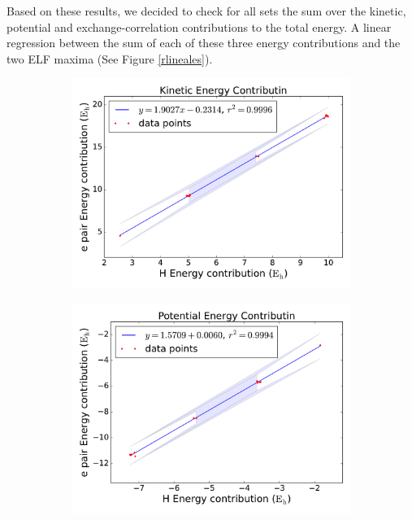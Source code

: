 Based on these results, we decided to check for all sets the sum over the
kinetic, potential and exchange-correlation contributions to the total energy.
A linear regression between the sum of each of these three energy contributions
and the two ELF maxima
(See
Figure \ref{rlineales}).

\begin{figure}[hb]
     \centering
     \begin{subfigure}[b]{0.32\textwidth}
         \centering
         \includegraphics[width=\textwidth]{4/plots/promelf/rl_t1_t2}
     \end{subfigure}
     \hfill
     \begin{subfigure}[b]{0.32\textwidth}
         \centering
         \includegraphics[width=\textwidth]{4/plots/promelf/rl_v1_v2}

\end{subfigure}
\end{figure}
